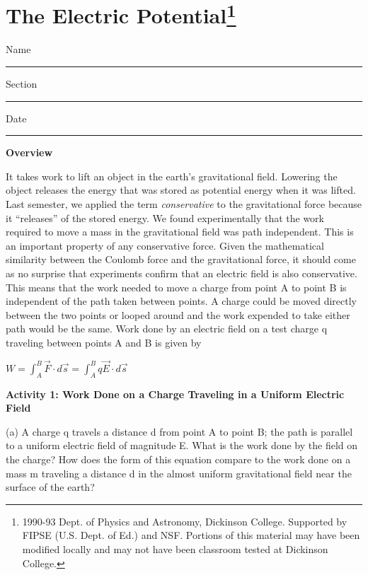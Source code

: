 
\section{The Electric Potential\footnote{%
1990-93 Dept. of Physics and Astronomy, Dickinson College. Supported
by FIPSE (U.S. Dept. of Ed.) and NSF. Portions of this material may
have been modified locally and may not have been classroom tested
at Dickinson College.
}}

Name \rule{2.0in}{0.1pt}\hfill{}Section \rule{1.0in}{0.1pt}\hfill{}Date
\rule{1.0in}{0.1pt}

\textbf{Overview}

It takes work to lift an object in the earth's gravitational field.
Lowering the object releases the energy that was stored as potential
energy when it was lifted. Last semester, we applied the term \emph{conservative}
to the gravitational force because it {}``releases'' 
of the stored energy. We found experimentally that the work required
to move a mass in the gravitational field was path independent. This
is an important property of any conservative force. Given the mathematical
similarity between the Coulomb force and the gravitational force,
it should come as no surprise that experiments confirm that an electric
field is also conservative. This means that the work needed to move
a charge from point A to point B is independent of the path taken
between points. A charge could be moved directly between the two points
or looped around and the work expended to take either path would be
the same. Work done by an electric field on a test charge q traveling
between points A and B is given by

{\centering \( W=\int ^{B}_{A} \)\( \overrightarrow{F}\cdot d\overrightarrow{s}=\int ^{B}_{A}q\overrightarrow{E}\cdot d\overrightarrow{s} \)\par}

\textbf{Activity 1: Work Done on a Charge Traveling in a Uniform Electric
Field}

(a) A charge q travels a distance d from point A to point B; the path
is parallel to a uniform electric field of magnitude E. What is the
work done by the field on the charge? How does the form of this equation
compare to the work done on a mass m traveling a distance d in the
almost uniform gravitational field near the surface of the earth?


